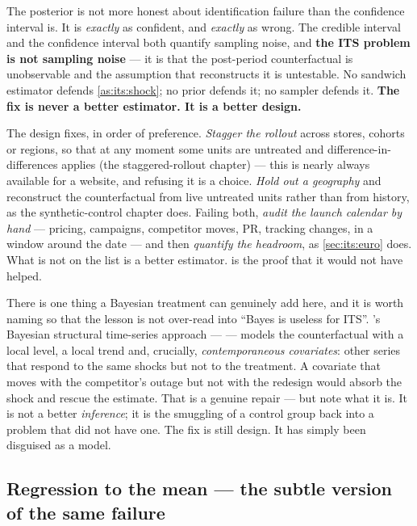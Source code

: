 \begin{remark}
The posterior is not more honest about identification failure than the confidence interval is. It
is \emph{exactly} as confident, and \emph{exactly} as wrong. The credible interval and the
confidence interval both quantify sampling noise, and \textbf{the ITS problem is not sampling
noise} --- it is that the post-period counterfactual is unobservable and the assumption that
reconstructs it is untestable. No sandwich estimator defends \cref{as:its:shock}; no prior defends
it; no sampler defends it. \textbf{The fix is never a better estimator. It is a better design.}
\end{remark}

The design fixes, in order of preference. \emph{Stagger the rollout} across stores, cohorts or
regions, so that at any moment some units are untreated and difference-in-differences applies
(the staggered-rollout chapter) --- this is nearly always available for a website, and refusing
it is a choice.
\emph{Hold out a geography} and reconstruct the counterfactual from live untreated units rather
than from history, as the synthetic-control chapter does. Failing both, \emph{audit the launch
calendar by hand} --- pricing, campaigns, competitor moves, PR, tracking changes, in a window
around the date --- and then \emph{quantify the headroom}, as \cref{sec:its:euro} does. What is not
on the list is a better estimator.  is the proof that it would not have helped.

There is one thing a Bayesian treatment can genuinely add here, and it is worth naming so that the
lesson is not over-read into ``Bayes is useless for ITS''. 's Bayesian
structural time-series approach ---  --- models the counterfactual with a local
level, a local trend and, crucially, \emph{contemporaneous covariates}: other series that respond
to the same shocks but not to the treatment. A covariate that moves with the competitor's outage
but not with the redesign would absorb the shock and rescue the estimate. That is a genuine repair
--- but note what it is. It is not a better \emph{inference}; it is the smuggling of a control
group back into a problem that did not have one. The fix is still design. It has simply been
disguised as a model.

\subsection*{Regression to the mean --- the subtle version of the same failure}

